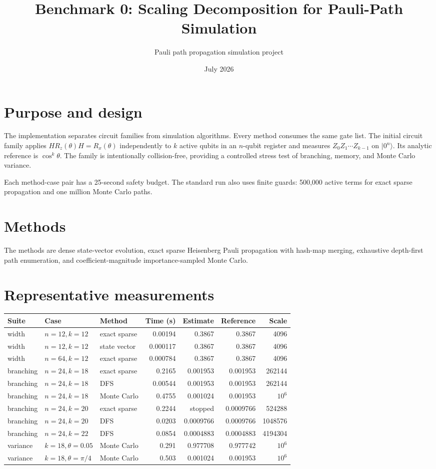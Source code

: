 \documentclass[10pt]{article}
\title{Benchmark 0: Scaling Decomposition for Pauli-Path Simulation}
\author{Pauli path propagation simulation project}
\date{July 2026}
\begin{document}
\maketitle
\section{Purpose and design}
The implementation separates circuit families from simulation algorithms. Every method consumes the same gate list. The initial circuit family applies $H R_z(\theta)H=R_x(\theta)$ independently to $k$ active qubits in an $n$-qubit register and measures $Z_0Z_1\cdots Z_{k-1}$ on $|0^n\rangle$. Its analytic reference is $\cos^k\theta$. The family is intentionally collision-free, providing a controlled stress test of branching, memory, and Monte Carlo variance.

Each method-case pair has a 25-second safety budget. The standard run also uses finite guards: 500,000 active terms for exact sparse propagation and one million Monte Carlo paths.
\section{Methods}
The methods are dense state-vector evolution, exact sparse Heisenberg Pauli propagation with hash-map merging, exhaustive depth-first path enumeration, and coefficient-magnitude importance-sampled Monte Carlo.
\section{Representative measurements}
\small
\begin{longtable}{lllrrrr}
\toprule Suite & Case & Method & Time (s) & Estimate & Reference & Scale\\\midrule\endhead
width & $n=12,k=12$ & exact sparse & 0.00194 & 0.3867 & 0.3867 & 4096\\
width & $n=12,k=12$ & state vector & 0.000117 & 0.3867 & 0.3867 & 4096\\
width & $n=64,k=12$ & exact sparse & 0.000784 & 0.3867 & 0.3867 & 4096\\
branching & $n=24,k=18$ & exact sparse & 0.2165 & 0.001953 & 0.001953 & 262144\\
branching & $n=24,k=18$ & DFS & 0.00544 & 0.001953 & 0.001953 & 262144\\
branching & $n=24,k=18$ & Monte Carlo & 0.4755 & 0.001024 & 0.001953 & $10^6$\\
branching & $n=24,k=20$ & exact sparse & 0.2244 & stopped & 0.0009766 & 524288\\
branching & $n=24,k=20$ & DFS & 0.0203 & 0.0009766 & 0.0009766 & 1048576\\
branching & $n=24,k=22$ & DFS & 0.0854 & 0.0004883 & 0.0004883 & 4194304\\
variance & $k=18,\theta=0.05$ & Monte Carlo & 0.291 & 0.977708 & 0.977742 & $10^6$\\
variance & $k=18,\theta=\pi/4$ & Monte Carlo & 0.503 & 0.001024 & 0.001953 & $10^6$\\
\bottomrule
\end{longtable}
\end{document}
